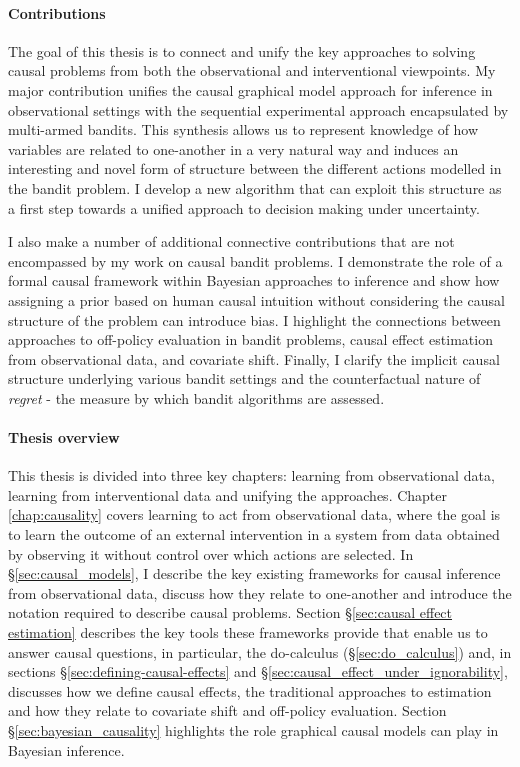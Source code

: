 \documentclass[11pt,a4paper,twoside]{report}
\theoremstyle{plain}
\theoremstyle{definition}
\begin{document}
\paragraph{Contributions}  The goal of this thesis is to connect and unify the key approaches to solving causal problems from both the observational and interventional viewpoints. My major contribution unifies the causal graphical model approach for inference in observational settings with the sequential experimental approach encapsulated by multi-armed bandits. This synthesis allows us to represent knowledge of how variables are related to one-another in a very natural way and induces an interesting and novel form of structure between the different actions modelled in the bandit problem. I develop a new algorithm that can exploit this structure as a first step towards a unified approach to decision making under uncertainty.

I also make a number of additional connective contributions that are not encompassed by my work on causal bandit problems. I demonstrate the role of a formal causal framework within Bayesian approaches to inference and show how assigning a prior based on human causal intuition without considering the causal structure of the problem can introduce bias. I highlight the connections between approaches to off-policy evaluation in bandit problems, causal effect estimation from observational data, and covariate shift. Finally, I clarify the implicit causal structure underlying various bandit settings and the counterfactual nature of \emph{regret} - the measure by which bandit algorithms are assessed.

\paragraph{Thesis overview} This thesis is divided into three key chapters: learning from observational data, learning from interventional data and unifying the approaches. Chapter \ref{chap:causality} covers learning to act from observational data, where the goal is to learn the outcome of an external intervention in a system from data obtained by observing it without control over which actions are selected. In \S\ref{sec:causal_models}, I describe the key existing frameworks for causal inference from observational data, discuss how they relate to one-another and introduce the notation required to describe causal problems. Section \S\ref{sec:causal effect estimation} describes the key tools these frameworks provide that enable us to answer causal questions, in particular, the do-calculus (\S\ref{sec:do_calculus}) and, in sections \S\ref{sec:defining-causal-effects} and \S\ref{sec:causal_effect_under_ignorability}, discusses how we define causal effects, the traditional approaches to estimation and how they relate to covariate shift and off-policy evaluation. Section \S\ref{sec:bayesian_causality} highlights the role graphical causal models can play in Bayesian inference. 
\end{document}
